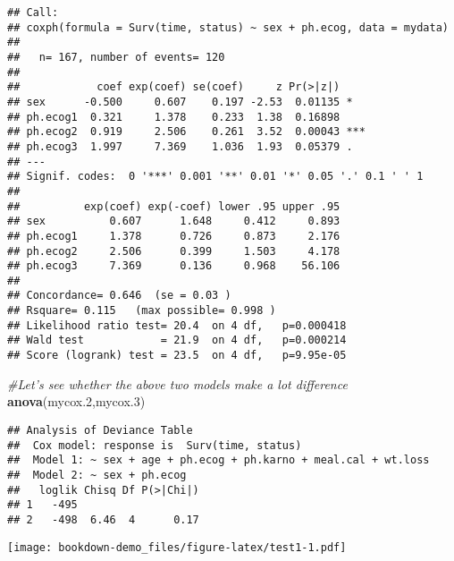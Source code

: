 \documentclass[]{book}
\newenvironment{Shaded}{\begin{snugshade}}{\end{snugshade}}
\newcommand{\KeywordTok}[1]{\textcolor[rgb]{0.13,0.29,0.53}{\textbf{#1}}}
\newcommand{\DataTypeTok}[1]{\textcolor[rgb]{0.13,0.29,0.53}{#1}}
\newcommand{\DecValTok}[1]{\textcolor[rgb]{0.00,0.00,0.81}{#1}}
\newcommand{\StringTok}[1]{\textcolor[rgb]{0.31,0.60,0.02}{#1}}
\newcommand{\CommentTok}[1]{\textcolor[rgb]{0.56,0.35,0.01}{\textit{#1}}}
\newcommand{\NormalTok}[1]{#1}
\theoremstyle{definition}
\theoremstyle{definition}
\theoremstyle{definition}
\theoremstyle{remark}
\begin{document}
\begin{verbatim}
## Call:
## coxph(formula = Surv(time, status) ~ sex + ph.ecog, data = mydata)
## 
##   n= 167, number of events= 120 
## 
##            coef exp(coef) se(coef)     z Pr(>|z|)    
## sex      -0.500     0.607    0.197 -2.53  0.01135 *  
## ph.ecog1  0.321     1.378    0.233  1.38  0.16898    
## ph.ecog2  0.919     2.506    0.261  3.52  0.00043 ***
## ph.ecog3  1.997     7.369    1.036  1.93  0.05379 .  
## ---
## Signif. codes:  0 '***' 0.001 '**' 0.01 '*' 0.05 '.' 0.1 ' ' 1
## 
##          exp(coef) exp(-coef) lower .95 upper .95
## sex          0.607      1.648     0.412     0.893
## ph.ecog1     1.378      0.726     0.873     2.176
## ph.ecog2     2.506      0.399     1.503     4.178
## ph.ecog3     7.369      0.136     0.968    56.106
## 
## Concordance= 0.646  (se = 0.03 )
## Rsquare= 0.115   (max possible= 0.998 )
## Likelihood ratio test= 20.4  on 4 df,   p=0.000418
## Wald test            = 21.9  on 4 df,   p=0.000214
## Score (logrank) test = 23.5  on 4 df,   p=9.95e-05
\end{verbatim}

\begin{Shaded}
\begin{Highlighting}[]
\CommentTok{#Let's see whether the above two models make a lot difference}
\KeywordTok{anova}\NormalTok{(mycox.}\DecValTok{2}\NormalTok{,mycox.}\DecValTok{3}\NormalTok{)}
\end{Highlighting}
\end{Shaded}

\begin{verbatim}
## Analysis of Deviance Table
##  Cox model: response is  Surv(time, status)
##  Model 1: ~ sex + age + ph.ecog + ph.karno + meal.cal + wt.loss
##  Model 2: ~ sex + ph.ecog
##   loglik Chisq Df P(>|Chi|)
## 1   -495                   
## 2   -498  6.46  4      0.17
\end{verbatim}

\begin{Shaded}
\end{Shaded}

\texttt{[image: bookdown-demo\_files/figure-latex/test1-1.pdf]}
\end{document}
